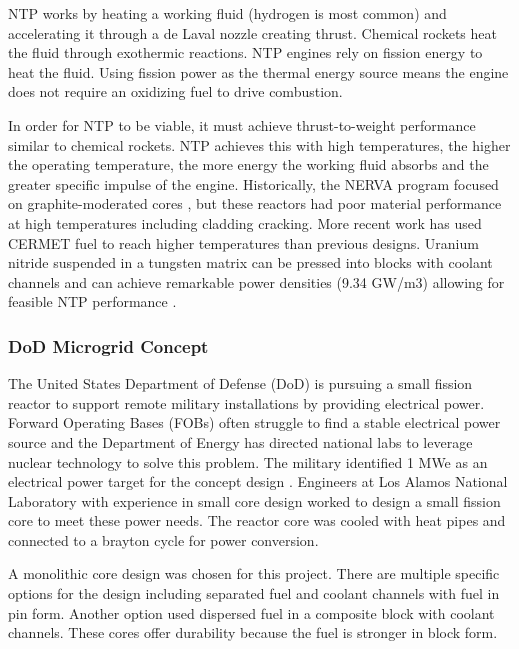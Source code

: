     NTP works by heating a working fluid (hydrogen is most common) and
    accelerating it through a de Laval nozzle creating thrust. Chemical rockets
    heat the fluid through exothermic reactions. NTP engines rely on fission
    energy to heat the fluid. Using fission power as the thermal energy source means the engine does not require an
    oxidizing fuel to drive combustion.

    In order for NTP to be viable, it must achieve thrust-to-weight performance
    similar to chemical rockets. NTP achieves this with high temperatures, the
    higher the operating temperature, the more energy the working fluid absorbs
    and the greater specific impulse of the engine. Historically, the NERVA
    program focused on graphite-moderated cores \citep{webb_combined_2011}, but
    these reactors had poor material performance at high temperatures including
    cladding cracking. More recent work has used CERMET fuel to reach higher
    temperatures than previous designs. Uranium nitride suspended in a tungsten matrix
    can be pressed into blocks with coolant channels and can achieve remarkable
    power densities (9.34 GW/m3) allowing for feasible NTP performance
    \citep{webb_combined_2011}.

    \subsubsection{DoD Microgrid Concept}
    The United States Department of Defense (DoD) is pursuing a small fission
    reactor to support remote military installations by providing electrical
    power. Forward Operating Bases (FOBs) often struggle to find a stable
    electrical power source and the Department of Energy has directed national
    labs to leverage nuclear technology to solve this problem. The military
    identified 1 MWe as an electrical power target for the concept design
    \citep{army_reactor_slides}.
    Engineers at Los Alamos National Laboratory with experience in small core
    design worked to design a small fission core to meet these power needs. The
    reactor core was cooled with heat pipes and connected to a brayton cycle for
    power conversion.

    A monolithic core design was chosen for this project. There are multiple
    specific options for the design including separated fuel and coolant
    channels with fuel in pin form. Another option used dispersed fuel in a
    composite block with coolant channels. These cores offer durability because
    the fuel is stronger in block form.

